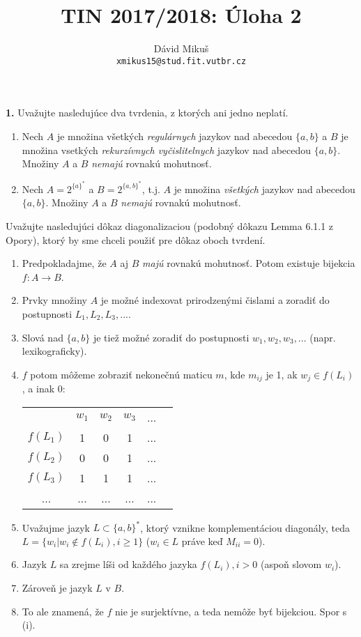 \documentclass[11pt]{article}
\newcommand{\task}[2]{\par \noindent \textbf{{#1}.} \hspace{3pt} #2 \vspace{10pt}}
\begin{document}
 
\title{TIN 2017/2018: Úloha 2}
\author{Dávid Mikuš \\ \small\texttt{xmikus15@stud.fit.vutbr.cz}}
\maketitle

\task{1}{
Uvažujte nasledujúce dva tvrdenia, z ktorých ani jedno neplatí.
\begin{enumerate}[label=(\alph*)]
\item Nech $A$ je množina všetkých \textit{regulárnych} jazykov nad abecedou $\{a,b\}$ a $B$ je množina vsetkých \textit{rekurzívnych vyčislitelnych} jazykov nad abecedou $\{a,b\}$. Množiny $A$ a $B$ \textit{nemajú} rovnakú mohutnosť.
\item Nech $A = 2^{\{a\}^*}$ a $B = 2^{\{a,b\}^*}$, t.j. $A$ je množina \textit{všetkých} jazykov nad abecedou $\{a,b\}$. Množiny $A$ a $B$ \textit{nemajú} rovnakú mohutnosť.
\end{enumerate}
}
Uvažujte nasledujúci dôkaz diagonalizaciou (podobný dôkazu Lemma 6.1.1 z Opory), ktorý by sme chceli použiť pre dôkaz oboch tvrdení.
\begin{enumerate}[label=\roman*.]
\item Predpokladajme, že $A$ aj $B$ \textit{majú} rovnakú mohutnosť. Potom existuje bijekcia $f : A \to B$.
\item \label{mistake_b} Prvky množiny $A$ je možné indexovat prirodzenými čislami a zoradiť do postupnosti $L_1,L_2,L_3,...$.
\item Slová nad $\{a,b\}$ je tiež možné zoradiť do postupnosti $w_1, w_2, w_3, ...$ (napr. lexikograficky).
\item $f$ potom môžeme zobraziť nekonečnú maticu $m$, kde $m_{ij}$ je 1, ak $w_j \in f(L_i)$, a inak 0:
\begin{table}[H]
				\centering
				\begin{tabular}{cccccc}
								& $w_1$	& $w_2$	& $w_3$	& ...   \\
					$f(L_1)$	& 1 	& 0 	& 1 	& ... & \\
					$f(L_2)$	& 0 	& 0 	& 1 	& ... & \\
					$f(L_3)$	& 1 	& 1		& 1 	& ... & \\
					...			& ... 	& 	... & ... 	& ...        
				\end{tabular}
			\end{table}
\item Uvažujme jazyk $L \subset \{a,b\}^*$, ktorý vznikne komplementáciou diagonály, teda \\
$L = \{w_i | w_i \notin f(L_i), i \geq 1 \}$ ($w_i \in L$ práve keď $M_{ii} = 0$).
\item Jazyk $L$ sa zrejme líši od každého jazyka $f(L_i), i > 0$ (aspoň slovom $w_i$).
\item \label{mistake_a} Zároveň je jazyk $L$ v $B$.
\item To ale znamená, že $f$ nie je surjektívne, a teda nemôže byť bijekciou. Spor s (i).
\end{enumerate}
\end{document}
